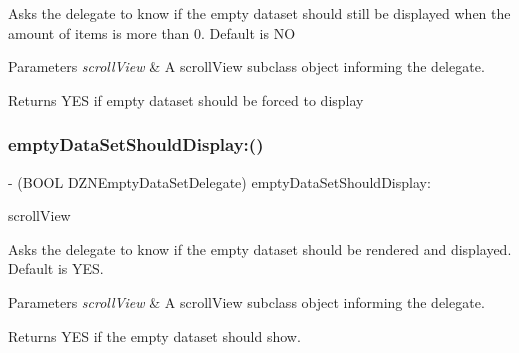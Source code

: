 Asks the delegate to know if the empty dataset should still be displayed when the amount of items is more than 0. Default is NO


\begin{DoxyParams}{Parameters}
{\em scroll\+View} & A scroll\+View subclass object informing the delegate. \\
\hline
\end{DoxyParams}
\begin{DoxyReturn}{Returns}
Y\+ES if empty dataset should be forced to display 
\end{DoxyReturn}
\mbox{\label{protocol_d_z_n_empty_data_set_delegate_01-p_acfa1fabccb424a1a7dd9acec9772b42d}} 
\subsubsection{\texorpdfstring{empty\+Data\+Set\+Should\+Display\+:()}{emptyDataSetShouldDisplay:()}}
{\footnotesize\ttfamily -\/ (B\+O\+OL D\+Z\+N\+Empty\+Data\+Set\+Delegate) empty\+Data\+Set\+Should\+Display\+: \begin{DoxyParamCaption}\item[{(U\+I\+Scroll\+View $\ast$)}]{scroll\+View }\end{DoxyParamCaption}\hspace{0.3cm}{\ttfamily [optional]}}

Asks the delegate to know if the empty dataset should be rendered and displayed. Default is Y\+ES.


\begin{DoxyParams}{Parameters}
{\em scroll\+View} & A scroll\+View subclass object informing the delegate. \\
\hline
\end{DoxyParams}
\begin{DoxyReturn}{Returns}
Y\+ES if the empty dataset should show. 
\end{DoxyReturn}
\mbox{\label{protocol_d_z_n_empty_data_set_delegate_01-p_a47b08b7ac9885d93f82a130379aef5f6}} 
